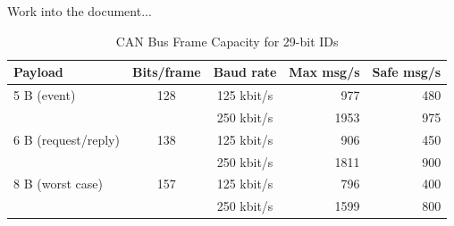 Work into the document...

\begin{table}[H]
\centering
\begin{tabular}{|l|c|c|r|r|}
\hline
\textbf{Payload} & \textbf{Bits/frame} & \textbf{Baud rate} & \textbf{Max msg/s} & \textbf{Safe msg/s} \\
\hline
5 B (event) & 128 & 125 kbit/s & 977 & 480 \\
            &     & 250 kbit/s & 1953 & 975 \\
\hline
6 B (request/reply) & 138 & 125 kbit/s & 906 & 450 \\
                    &     & 250 kbit/s & 1811 & 900 \\
\hline
8 B (worst case) & 157 & 125 kbit/s & 796 & 400 \\
                 &     & 250 kbit/s & 1599 & 800 \\
\hline
\end{tabular}
\label{tab:can_bus_capacity}
\caption{CAN Bus Frame Capacity for 29-bit IDs}
\end{table}